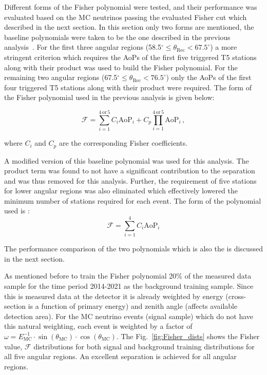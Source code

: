 Different forms of the Fisher polynomial were tested, and their performance was evaluated based on the MC neutrinos passing the evaluated Fisher cut which described in the next section. In this section only two forms are mentioned, the baseline polynomials were taken to be the one described in the previous analysis~\cite{gap_note_2013}. For the first three angular regions (58.5$^\circ \leq \theta_{\text{Rec}} < 67.5^\circ$) a more stringent criterion which requires the AoPs of the first five triggered T5 stations along with their product was used to build the Fisher polynomial. For the remaining two angular regions (67.5$^\circ \leq \theta_{\text{Rec}} < 76.5^\circ$) only the AoPs of the first four triggered T5 stations along with their product were required. The form of the Fisher polynomial used in the previous analysis is given below:

\begin{equation}
  \mathcal{F} = \sum_{i=1}^{4\,\text{or}\,5} C_i \text{AoP}_i + C_p \prod_{i=1}^{4\,\text{or}\,5} \text{AoP}_i \, ,
\end{equation}

where $C_i$ and $C_p$ are the corresponding Fisher coefficients. 

A modified version of this baseline polynomial was used for this analysis. The product term was found to not have a significant contribution to the separation and was thus removed for this analysis. Further, the requirement of five stations for lower angular regions was also eliminated which effectively lowered the minimum number of stations required for each event. The form of the polynomial used is : 
\begin{equation}
  \label{eq:fisher_poly_new}
  \mathcal{F} = \sum_{i=1}^{4} C_i \text{AoP}_i
\end{equation}

The performance comparison of the two polynomials which is also the is discussed in the next section.

As mentioned before to train the Fisher polynomial 20\% of the measured data sample for the time period 2014-2021 as the background training sample. Since this is measured data at the detector it is already weighted by energy (cross-section is a function of primary energy) and zenith angle (affects available detection area). For the MC neutrino events (signal sample) which do not have this natural weighting, each event is weighted by a factor of $\omega = E_{\text{MC}}^{-1} \cdot \sin(\theta_{\text{MC}}) \cdot \cos(\theta_{\text{MC}})$. The Fig.~\ref{fig:Fisher_dists} shows the Fisher value, $\mathcal{F}$ distributions for both signal and background training distributions for all five angular regions. An excellent separation is achieved for all angular regions. 

